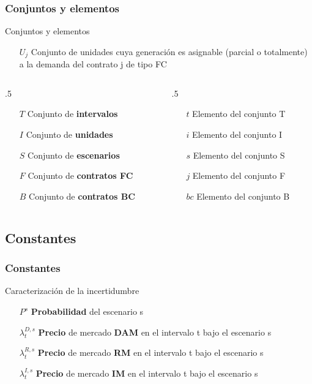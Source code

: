 \documentclass[xcolor=dvipsnames, utf8, spanish]{beamer} %
\begin{document}
\begin{frame}
	\frametitle{Conjuntos y elementos}
	\begin{block} {Conjuntos y elementos}
		\begin{itemize}
			\item [$U_{j}$] Conjunto de unidades cuya generación es asignable (parcial o totalmente) a la demanda del contrato j de tipo FC
		\end{itemize}
		\begin{columns}
			\begin{column} {.5\textwidth}
				\begin{itemize}
				\item [$T$] Conjunto de \textbf{intervalos}
				\item [$I$] Conjunto de \textbf{unidades}
				\item [$S$] Conjunto de \textbf{escenarios}
				\item [$F$] Conjunto de \textbf{contratos FC}
				\item [$B$] Conjunto de \textbf{contratos BC}
				\end{itemize}
			\end{column}
			\begin{column} {.5\textwidth}
				\begin{itemize}
				\item [$t$] Elemento del conjunto T
				\item [$i$] Elemento del conjunto I
				\item [$s$] Elemento del conjunto S
				\item [$j$] Elemento del conjunto F
				\item [$bc$] Elemento del conjunto B
				\end{itemize}
			\end{column}
		\end{columns}
	\end{block}
\end{frame}

\subsection{Constantes}

\begin{frame}
	\frametitle{Constantes}
	\begin{block} {Caracterización de la incertidumbre}
		\begin{itemize}
			\item [$P^s$] \textbf{Probabilidad} del escenario s
			\item [$\lambda^{D,s}_t$] \textbf{Precio} de mercado \textbf{DAM} en el intervalo t bajo el escenario s
			\item [$\lambda^{R,s}_t$] \textbf{Precio} de mercado \textbf{RM} en el intervalo t bajo el escenario s
			\item [$\lambda^{I,s}_t$] \textbf{Precio} de mercado \textbf{IM} en el intervalo t bajo el escenario s
		\end{itemize}
	\end{block}
\end{frame}
\end{document}
